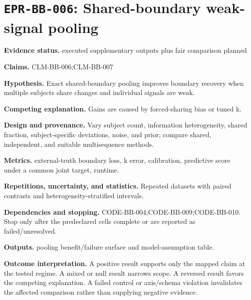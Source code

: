 \section[\texttt{EPR-BB-006}]{\texttt{EPR-BB-006}: Shared-boundary weak-signal pooling}
\textbf{Evidence status.} executed supplementary outputs plus fair comparison planned\par
\textbf{Claims.} CLM-BB-006;CLM-BB-007\par
\textbf{Hypothesis.} Exact shared-boundary pooling improves boundary recovery when multiple subjects share changes and individual signals are weak.\par
\textbf{Competing explanation.} Gains are caused by forced-sharing bias or tuned k.\par
\textbf{Design and provenance.} Vary subject count, information heterogeneity, shared fraction, subject-specific deviations, noise, and prior; compare shared, independent, and suitable multisequence methods.\par
\textbf{Metrics.} external-truth boundary loss, k error, calibration, predictive score under a common joint target, runtime.\par
\textbf{Repetitions, uncertainty, and statistics.} Repeated datasets with paired contrasts and heterogeneity-stratified intervals.\par
\textbf{Dependencies and stopping.} CODE-BB-004;CODE-BB-009;CODE-BB-010. Stop only after the predeclared cells complete or are reported as failed/unresolved.\par
\textbf{Outputs.} pooling benefit/failure surface and model-assumption table.\par
\textbf{Outcome interpretation.} A positive result supports only the mapped claim at the tested regime. A mixed or null result narrows scope. A reversed result favors the competing explanation. A failed control or axis/schema violation invalidates the affected comparison rather than supplying negative evidence.

